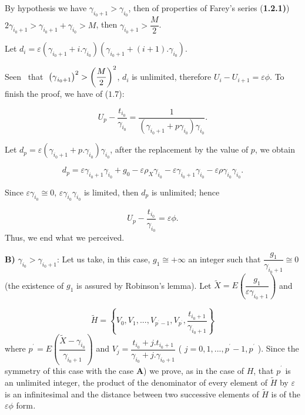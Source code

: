 \documentclass[12pt]{article}
\begin{document}
\noindent By hypothesis we have $\gamma _{i_{0}+1}>\gamma _{i_{0}}$, then of
properties of Farey's series (\textbf{1.2.1)}) $2\gamma _{i_{0}+1}>\gamma
_{i_{0}+1}+\gamma _{i_{0}}>M$, then $\gamma _{i_{0}+1}>\dfrac{M}{2}$.

\noindent Let $d_{i}=\varepsilon \left( \gamma _{i_{0}+1}+i.\gamma
_{i_{0}}\right) \left( \gamma _{i_{0}+1}+\left( i+1\right) .\gamma
_{i_{0}}\right) $.

\noindent Seen \ that$\ \ \left( \gamma _{i_{0}+1}\right) ^{2}>\left( \dfrac{%
M}{2}\right) ^{2}$, $d_{i}$ is unlimited, therefore $U_{i}-U_{i+1}=%
\varepsilon \phi $. To finish the proof, we have of ($1.7$):

\begin{equation*}
U_{p}-\dfrac{t_{i_{0}}}{\gamma _{i_{0}}}=\dfrac{1}{\left( \gamma
_{i_{0}+1}+p\gamma _{i_{0}}\right) \gamma _{i_{0}}}\text{.}
\end{equation*}

\noindent Let $d_{p}=\varepsilon \left( \gamma _{i_{0}+1}+p.\gamma
_{i_{0}}\right) \gamma _{i_{0}}$, after the replacement by the value of $p$,
we obtain

\begin{equation*}
d_{p}=\varepsilon \gamma _{i_{0}+1}\gamma _{i_{0}}+g_{0}-\varepsilon \rho
_{X}\gamma _{i_{0}}-\varepsilon \gamma _{i_{0}+1}\gamma _{i_{0}}-\varepsilon
\rho \gamma _{i_{0}}\gamma _{i_{0}}\text{.}
\end{equation*}

\noindent Since $\varepsilon \gamma _{i_{0}}\cong 0$, $\varepsilon \gamma
_{i_{0}}\gamma _{i_{0}}$ is limited, then $d_{p}$ is unlimited; hence

\begin{equation*}
U_{p}-\dfrac{t_{i_{0}}}{\gamma _{i_{0}}}=\varepsilon \phi \text{.}
\end{equation*}%
Thus, we end what we perceived.\newline

\noindent \textbf{B)} $\gamma _{i_{0}}>\gamma _{i_{0}+1}$: Let us take, in
this case, $g_{1}\cong +\infty $ an integer such that $\dfrac{g_{1}}{\gamma
_{i_{0}+1}}\cong 0$ (the existence of $g_{1}$ is assured by Robinson's
lemma). Let $\widetilde{X}=E\left( \dfrac{g_{1}}{\varepsilon \gamma
_{i_{0}+1}}\right) $ and

\begin{equation*}
\widetilde{H}=\left\{ V_{0},V_{1},...,V_{p^{^{\prime }}-1},V_{p^{^{\prime
}}},\dfrac{t_{i_{0}+1}}{\gamma _{i_{0}+1}}\right\}
\end{equation*}%
where $p^{^{\prime }}=E\left( \dfrac{\widetilde{X}-\gamma _{i_{0}}}{\gamma
_{i_{0}+1}}\right) $ and $V_{j}=\dfrac{t_{i_{0}}+j.t_{i_{0}+1}}{\gamma
_{i_{0}}+j.\gamma _{i_{0}+1}}$ ( $j=0,1,...,p^{^{\prime }}-1,p^{^{\prime }}$%
). Since the symmetry of this case with the case \textbf{A}) we prove, as in
the case of $H$, that $p^{^{\prime }}$ is an unlimited integer, the product
of the denominator of every element of $\widetilde{H}$ by $\varepsilon $ is
an infinitesimal and the distance between two successive elements of $%
\widetilde{H}$ is of the $\varepsilon \phi $ form\textit{.}
\end{document}
